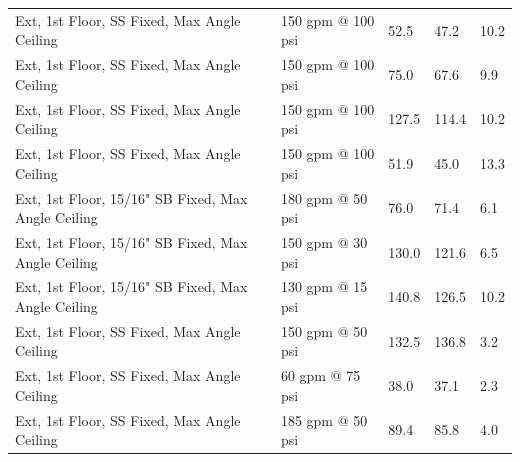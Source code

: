 \documentclass{book}
\begin{document}
\begin{table}[]
\begin{tabular}{lllll}
Ext, 1st Floor, SS Fixed, Max Angle Ceiling           & 150 gpm @ 100 psi                   & 52.5                                   & 47.2                                    & 10.2                                    \\
Ext, 1st Floor, SS Fixed, Max Angle Ceiling           & 150 gpm @ 100 psi                   & 75.0                                   & 67.6                                    & 9.9                                     \\
Ext, 1st Floor, SS Fixed, Max Angle Ceiling           & 150 gpm @ 100 psi                   & 127.5                                  & 114.4                                   & 10.2                                    \\
Ext, 1st Floor, SS Fixed, Max Angle Ceiling           & 150 gpm @ 100 psi                   & 51.9                                   & 45.0                                    & 13.3                                    \\
Ext, 1st Floor, 15/16" SB Fixed, Max Angle Ceiling    & 180 gpm @ 50 psi                    & 76.0                                   & 71.4                                    & 6.1                                     \\
Ext, 1st Floor, 15/16" SB Fixed, Max Angle Ceiling    & 150 gpm @ 30 psi                    & 130.0                                  & 121.6                                   & 6.5                                     \\
Ext, 1st Floor, 15/16" SB Fixed, Max Angle Ceiling    & 130 gpm @ 15 psi                    & 140.8                                  & 126.5                                   & 10.2                                    \\
Ext, 1st Floor, SS Fixed, Max Angle Ceiling           & 150 gpm @ 50 psi                    & 132.5                                  & 136.8                                   & 3.2                                     \\
Ext, 1st Floor, SS Fixed, Max Angle Ceiling           & 60 gpm @ 75 psi                     & 38.0                                   & 37.1                                    & 2.3                                     \\
Ext, 1st Floor, SS Fixed, Max Angle Ceiling           & 185 gpm @ 50 psi                    & 89.4                                   & 85.8                                    & 4.0                                     \\

\end{tabular}
\end{table}
\end{document}
